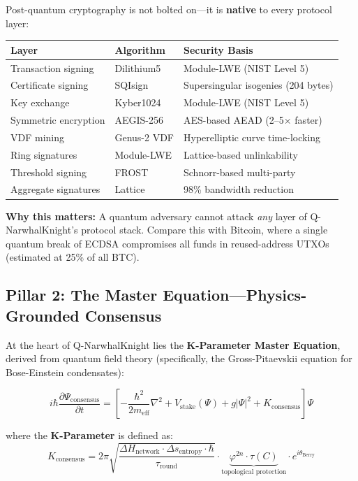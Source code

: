 \documentclass[11pt,a4paper]{article}
\begin{document}
Post-quantum cryptography is not bolted on---it is \textbf{native} to every protocol layer:

\begin{center}
\begin{tabular}{@{}lll@{}}
\toprule
\textbf{Layer} & \textbf{Algorithm} & \textbf{Security Basis} \\
\midrule
Transaction signing & Dilithium5 & Module-LWE (NIST Level 5) \\
Certificate signing & SQIsign & Supersingular isogenies (204 bytes) \\
Key exchange & Kyber1024 & Module-LWE (NIST Level 5) \\
Symmetric encryption & AEGIS-256 & AES-based AEAD (2--5$\times$ faster) \\
VDF mining & Genus-2 VDF & Hyperelliptic curve time-locking \\
Ring signatures & Module-LWE & Lattice-based unlinkability \\
Threshold signing & FROST & Schnorr-based multi-party \\
Aggregate signatures & Lattice & 98\% bandwidth reduction \\
\bottomrule
\end{tabular}
\end{center}

\textbf{Why this matters:} A quantum adversary cannot attack \textit{any} layer of Q-NarwhalKnight's protocol stack. Compare this with Bitcoin, where a single quantum break of ECDSA compromises all funds in reused-address UTXOs (estimated at 25\% of all BTC).

\subsection{Pillar 2: The Master Equation---Physics-Grounded Consensus}

At the heart of Q-NarwhalKnight lies the \textbf{K-Parameter Master Equation}, derived from quantum field theory (specifically, the Gross-Pitaevskii equation for Bose-Einstein condensates):

\begin{highlight}
\vspace{-0.5em}
\begin{equation}
    i\hbar \frac{\partial \Psi_{\text{consensus}}}{\partial t} = \left[ -\frac{\hbar^2}{2m_{\text{eff}}}\nabla^2 + V_{\text{stake}}(\Psi) + g|\Psi|^2 + K_{\text{consensus}} \right] \Psi
\end{equation}
\vspace{-1em}

where the \textbf{K-Parameter} is defined as:
\begin{equation}
    K_{\text{consensus}} = 2\pi \sqrt{\frac{\Delta H_{\text{network}} \cdot \Delta s_{\text{entropy}} \cdot \hbar}{\tau_{\text{round}}}} \cdot \underbrace{\varphi^{2n} \cdot \tau(C)}_{\text{topological protection}} \cdot e^{i\theta_{\text{Berry}}}
\end{equation}
\end{highlight}
\end{document}
